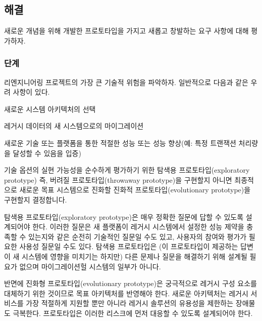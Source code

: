 \documentclass[a4paper,10pt,twoside]{book}
\begin{document}
\subsection*{해결}

새로운 개념을 위해 개발한 프로토타입을 가지고 새롭고 창발하는 요구 사항에 대해 평가하자.

\subsubsection*{단계}

\begin{bulletlist}
\item 리엔지니어링 프로젝트의 가장 큰 기술적 위험을 파악하자. 일반적으로 다음과 같은 우려 사항이 있다.

\begin{bulletlist}
\item 새로운 시스템 아키텍처의 선택
\item 레거시 데이터의 새 시스템으로의 마이그레이션
\item 새로운 기술 또는 플랫폼을 통한 적절한 성능 또는 성능 향상(예: 특정 트랜잭션 처리량을 달성할 수 있음을 입증)
\end{bulletlist}

\item 기술 옵션의 실현 가능성을 순수하게 평가하기 위한 탐색용 프로토타입(exploratory prototype) 즉, 버려질 프로토타입(throwaway prototype)을 구현할지 아니면 최종적으로 새로운 목표 시스템으로 진화할 진화적 프로토타입(evolutionary prototype)을 구현할지 결정합니다.

\begin{bulletlist}
\item 탐색용 프로토타입(exploratory prototype)은 매우 정확한 질문에 답할 수 있도록 설계되어야 한다. 이러한 질문은 새 플랫폼이 레거시 시스템에서 설정한 성능 제약을 충족할 수 있는지와 같은 순전히 기술적인 질문일 수도 있고, 사용자의 참여와 평가가 필요한 사용성 질문일 수도 있다. 탐색용 프로토타입은 (이 프로토타입이 제공하는 답변이 새 시스템에 영향을 미치기는 하지만) 다른 문제나 질문을 해결하기 위해 설계될 필요가 없으며 마이그레이션헐 시스템의 일부가 아니다.

\item 반면에 진화형 프로토타입(evolutionary prototype)은 궁극적으로 레거시 구성 요소를 대체하기 위한 것이므로 목표 아키텍처를 반영해야 한다. 새로운 아키텍처는 레거시 서비스를 가장 적절하게 지원할 뿐만 아니라 레거시 솔루션의 유용성을 제한하는 장애물도 극복한다. 프로토타입은 이러한 리스크에 먼저 대응할 수 있도록 설계되어야 한다.
\end{bulletlist}
\end{bulletlist}
\end{document}
